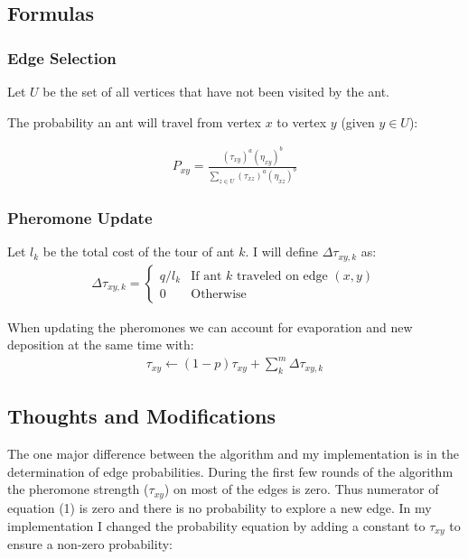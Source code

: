 \documentclass[twocolumn]{article}
\begin{document}
\subsection{Formulas}
\subsubsection{Edge Selection}
Let $U$ be the set of all vertices that have not been visited by the ant.

The probability an ant will travel from vertex $x$ to vertex $y$ (given $y \in U$):

\begin{align}
P_{xy} = \frac{(\tau_{xy})^a(\eta_{xy})^b}{\sum_{z \in U}^{}(\tau_{xz})^a (\eta_{xz})^b}
\end{align}
\cite{wikipedia_2022}

\subsubsection{Pheromone Update}
Let $l_k$ be the total cost of the tour of ant $k$.
I will define $\Delta\tau_{xy,k}$ as:
\begin{align}
    \Delta\tau_{xy,k} = 
    \begin{cases}
        q / l_k & \text{If ant } k \text{ traveled on edge } (x,y) \\
        0 & \text{Otherwise}
    \end{cases}
\end{align}

When updating the pheromones we can account for evaporation and new deposition at the 
same time with:
\begin{align}
    \tau_{xy} \gets (1 - p)\tau_{xy} + \sum_{k}^{m}\Delta\tau_{xy,k}    
\end{align}
\cite{wikipedia_2022}

\subsection{Thoughts and Modifications}
The one major difference between the algorithm and my implementation is in the 
determination of edge probabilities. During the first few rounds of the algorithm the pheromone strength ($\tau_{xy}$) on most of the edges is zero. Thus numerator of equation (1) is zero and there is no probability to explore a new edge. 
In my implementation I changed the probability equation by adding a constant to $\tau_{xy}$
to ensure a non-zero probability:
\end{document}
